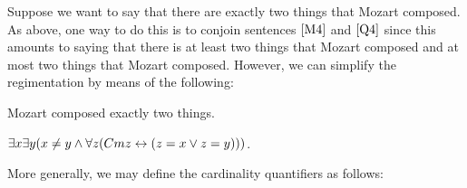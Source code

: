 Suppose we want to say that there are exactly two things that Mozart composed.
As above, one way to do this is to conjoin sentences $\ref{M4}$ and $\ref{Q4}$ since this amounts to saying that there is at least two things that Mozart composed and at most two things that Mozart composed. 
However, we can simplify the regimentation by means of the following:

\begin{earg}
  \item[\ex{Q7}] Mozart composed exactly two things.
  \item[\ex{Q8}] $\exists x\exists y(x \neq y \wedge \forall z(Cmz \leftrightarrow (z = x \vee z = y)))$.
\end{earg}

More generally, we may define the cardinality quantifiers as follows:

